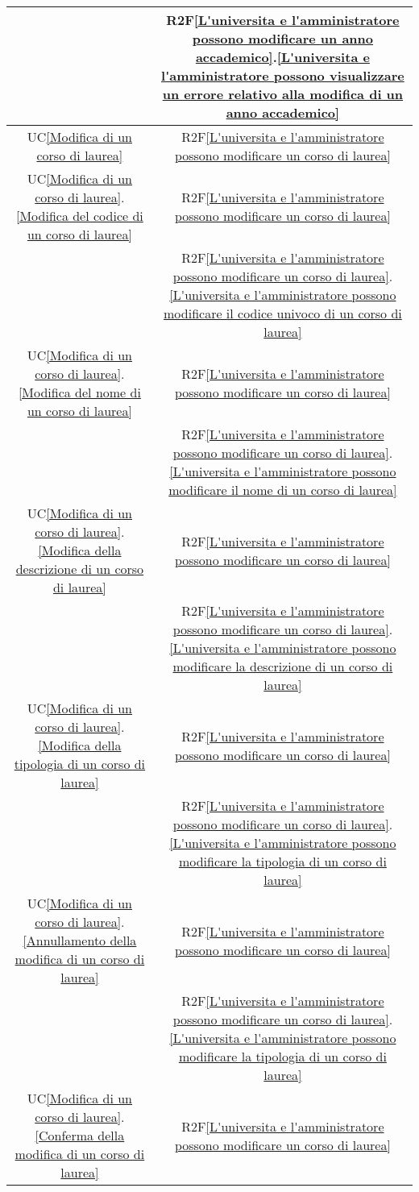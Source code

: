 \begin{longtable}{|c|c|}
& R2F\ref{L'universita e l'amministratore possono modificare un anno accademico}.\ref{L'universita e l'amministratore possono visualizzare un errore relativo alla modifica di un anno accademico}\\
\hline
UC\ref{Modifica di un corso di laurea} & R2F\ref{L'universita e l'amministratore possono modificare un corso di laurea}\\
\hline
UC\ref{Modifica di un corso di laurea}.\ref{Modifica del codice di un corso di laurea} & R2F\ref{L'universita e l'amministratore possono modificare un corso di laurea}\\
& R2F\ref{L'universita e l'amministratore possono modificare un corso di laurea}.\ref{L'universita e l'amministratore possono modificare il codice univoco di un corso di laurea}\\
\hline
UC\ref{Modifica di un corso di laurea}.\ref{Modifica del nome di un corso di laurea} & R2F\ref{L'universita e l'amministratore possono modificare un corso di laurea}\\
& R2F\ref{L'universita e l'amministratore possono modificare un corso di laurea}.\ref{L'universita e l'amministratore possono modificare il nome di un corso di laurea}\\
\hline
UC\ref{Modifica di un corso di laurea}.\ref{Modifica della descrizione di un corso di laurea} & R2F\ref{L'universita e l'amministratore possono modificare un corso di laurea}\\
& R2F\ref{L'universita e l'amministratore possono modificare un corso di laurea}.\ref{L'universita e l'amministratore possono modificare la descrizione di un corso di laurea}\\
\hline
UC\ref{Modifica di un corso di laurea}.\ref{Modifica della tipologia di un corso di laurea} & R2F\ref{L'universita e l'amministratore possono modificare un corso di laurea}\\
& R2F\ref{L'universita e l'amministratore possono modificare un corso di laurea}.\ref{L'universita e l'amministratore possono modificare la tipologia di un corso di laurea}\\
\hline
UC\ref{Modifica di un corso di laurea}.\ref{Annullamento della modifica di un corso di laurea} & R2F\ref{L'universita e l'amministratore possono modificare un corso di laurea}\\
& R2F\ref{L'universita e l'amministratore possono modificare un corso di laurea}.\ref{L'universita e l'amministratore possono modificare la tipologia di un corso di laurea}\\
\hline
UC\ref{Modifica di un corso di laurea}.\ref{Conferma della modifica di un corso di laurea} & R2F\ref{L'universita e l'amministratore possono modificare un corso di laurea}\\

\end{longtable}
